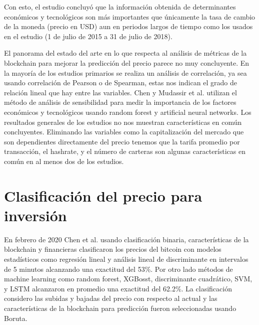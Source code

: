 Con esto, el estudio concluyó que la información obtenida de determinantes económicos y tecnológicos son más importantes que únicamente la tasa de cambio de la moneda (precio en USD) aun en periodos largos de tiempo como los usados en el estudio (1 de julio de 2015 a 31 de julio de 2018). 

El panorama del estado del arte en lo que respecta al análisis de métricas de la blockchain para mejorar la predicción del precio parece no muy concluyente. En la mayoría de los estudios primarios se realiza un análisis de correlación, ya sea usando correlación de Pearson o de Spearman, estas nos indican el grado de relación lineal que hay entre las variables. Chen y Mudassir et al. \cite{chenMachineLearningModel2021, mudassirTimeseriesForecastingBitcoin2020} utilizan el método de análisis de sensibilidad para medir la importancia de los factores económicos y tecnológicos usando random forest y artificial neural networks. Los resultados generales de los estudios no nos muestran características en común concluyentes. Eliminando las variables como la capitalización del mercado que son dependientes directamente del precio tenemos que la tarifa promedio por transacción, el hashrate, y el número de carteras son algunas características en común en al menos dos de los estudios.



\section{Clasificación del precio para inversión}
 
 
En febrero de 2020 Chen et al. \cite{chenBitcoinPricePrediction2020} usando clasificación binaria, características de la blockchain y financieras clasificaron los precios del bitcoin con modelos estadísticos como regresión lineal y análisis lineal de discriminante en intervalos de 5 minutos alcanzando una exactitud del 53\%. Por otro lado métodos de machine learning como random forest, XGBosst, discriminante cuadrático, SVM, y LSTM alcanzaron en promedio una exactitud del 62.2\%.
La clasificación considero las subidas y bajadas del precio con respecto al actual y las características de la blockchain para predicción fueron seleccionadas usando Boruta. 


